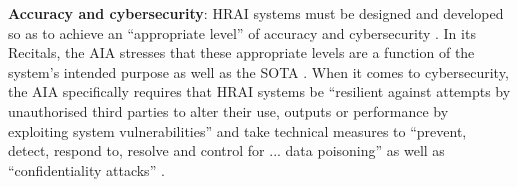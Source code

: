 
\textbf{Accuracy and cybersecurity}: 
HRAI systems must be designed and developed so as to achieve an ``appropriate level'' of accuracy and cybersecurity \citep[Art. 15.1]{european_union_ai_act_2024}. In its Recitals, the AIA stresses that these appropriate levels are a function of the system's intended purpose as well as the SOTA \citep[Rec. 74]{european_union_ai_act_2024}. When it comes to cybersecurity, the AIA specifically requires that HRAI systems be ``resilient against attempts by unauthorised third parties to alter their use, outputs or performance by exploiting system vulnerabilities'' \citep[Art. 15(5)]{european_union_ai_act_2024} and take technical measures to ``prevent, detect, respond to, resolve and control for ... data poisoning'' as well as ``confidentiality attacks'' \citep[Art. 15.5]{european_union_ai_act_2024}.


